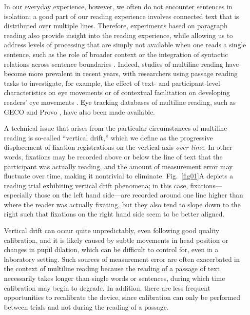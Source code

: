 \documentclass[doc,biblatex]{apa7}
\begin{document}
In our everyday experience, however, we often do not encounter sentences in isolation; a good part of our reading experience involves connected text that is distributed over multiple lines. Therefore, experiments based on paragraph reading also provide insight into the reading experience, while allowing us to address levels of processing that are simply not available when one reads a single sentence, such as the role of broader context or the integration of syntactic relations across sentence boundaries \parencite{Jarodzka:2017}. Indeed, studies of multiline reading have become more prevalent in recent years, with researchers using passage reading tasks to investigate, for example, the effect of text- and participant-level characteristics on eye movements \parencite{Kuperman:2018} or of contextual facilitation on developing readers' eye movements \parencite{TiffinRichards:2020}. Eye tracking databases of multiline reading, such as GECO \parencite{Cop:2017} and Provo \parencite{Luke:2018}, have also been made available.

A technical issue that arises from the particular circumstances of multiline reading is so-called ``vertical drift,'' which we define as the progressive displacement of fixation registrations on the vertical axis \textit{over time}. In other words, fixations may be recorded above or below the line of text that the participant was actually reading, and the amount of measurement error may fluctuate over time, making it nontrivial to eliminate. Fig.~\ref{fig01}A depicts a reading trial exhibiting vertical drift phenomena; in this case, fixations---especially those on the left hand side---are recorded around one line higher than where the reader was actually fixating, but they also tend to slope down to the right such that fixations on the right hand side seem to be better aligned.

Vertical drift can occur quite unpredictably, even following good quality calibration, and it is likely caused by subtle movements in head position or changes in pupil dilation, which can be difficult to control for, even in a laboratory setting. Such sources of measurement error are often exacerbated in the context of multiline reading because the reading of a passage of text necessarily takes longer than single words or sentences, during which time calibration may begin to degrade. In addition, there are less frequent opportunities to recalibrate the device, since calibration can only be performed between trials and not during the reading of a passage.
\end{document}
